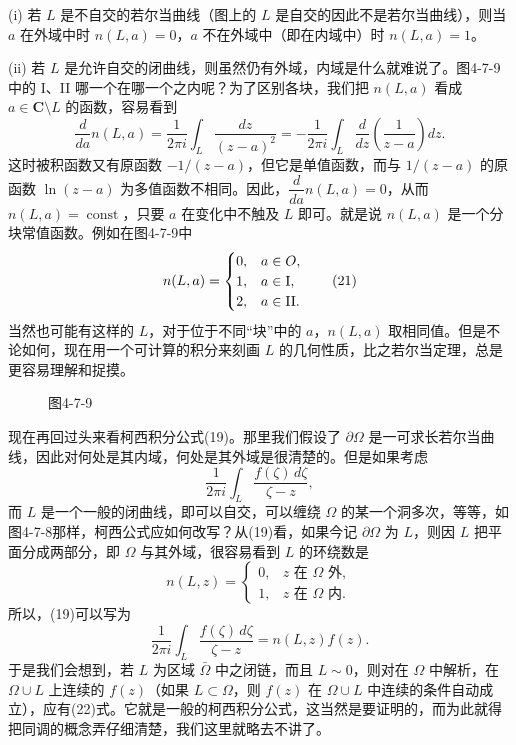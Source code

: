 (i) 若 $L$ 是不自交的若尔当曲线（图上的 $L$ 是自交的因此不是若尔当曲线），则当 $a$ 在外域中时 $n(L,a)=0$，$a$ 不在外域中（即在内域中）时 $n(L,a)=1$。

(ii) 若 $L$ 是允许自交的闭曲线，则虽然仍有外域，内域是什么就难说了。图4-7-9中的 I、II 哪一个在哪一个之内呢？为了区别各块，我们把 $n(L,a)$ 看成 $a\in\mathbf C\setminus L$ 的函数，容易看到
\[
 \frac d{da}n(L,a)=\frac1{2\pi i}\int_L\frac{dz}{(z-a)^2}
 =-\frac1{2\pi i}\int_L\frac d{dz}\left(\frac1{z-a}\right)dz.
\]
这时被积函数又有原函数 $-1/(z-a)$，但它是单值函数，而与 $1/(z-a)$ 的原函数 $\ln(z-a)$ 为多值函数不相同。因此，$\dfrac d{da}n(L,a)=0$，从而 $n(L,a)=\operatorname{const}$，只要 $a$ 在变化中不触及 $L$ 即可。就是说 $n(L,a)$ 是一个分块常值函数。例如在图4-7-9中
\begin{equation}
 n(L,a)=
 \begin{cases}
 0,&a\in O,\\
 1,&a\in {\rm I},\\
 2,&a\in {\rm II}.
 \end{cases}
 \tag{21}
\end{equation}
当然也可能有这样的 $L$，对于位于不同“块”中的 $a$，$n(L,a)$ 取相同值。但是不论如何，现在用一个可计算的积分来刻画 $L$ 的几何性质，比之若尔当定理，总是更容易理解和捉摸。

\begin{figure}[htbp]
\centering
{}
\caption*{图4-7-9}
\end{figure}

现在再回过头来看柯西积分公式(19)。那里我们假设了 $\partial\Omega$ 是一可求长若尔当曲线，因此对何处是其内域，何处是其外域是很清楚的。但是如果考虑
\[
 \frac1{2\pi i}\int_L\frac{f(\zeta)\,d\zeta}{\zeta-z},
\]
而 $L$ 是一个一般的闭曲线，即可以自交，可以缠绕 $\Omega$ 的某一个洞多次，等等，如图4-7-8那样，柯西公式应如何改写？从(19)看，如果今记 $\partial\Omega$ 为 $L$，则因 $L$ 把平面分成两部分，即 $\Omega$ 与其外域，很容易看到 $L$ 的环绕数是
\[
 n(L,z)=
 \begin{cases}
 0,&z\text{ 在 }\Omega\text{ 外},\\
 1,&z\text{ 在 }\Omega\text{ 内}.
 \end{cases}
\]
所以，(19)可以写为
\begin{equation}
 \frac1{2\pi i}\int_L\frac{f(\zeta)\,d\zeta}{\zeta-z}=n(L,z)f(z).
 \tag{22}
\end{equation}
于是我们会想到，若 $L$ 为区域 $\bar\Omega$ 中之闭链，而且 $L\sim0$，则对在 $\Omega$ 中解析，在 $\Omega\cup L$ 上连续的 $f(z)$（如果 $L\subset\Omega$，则 $f(z)$ 在 $\Omega\cup L$ 中连续的条件自动成立），应有(22)式。它就是一般的柯西积分公式，这当然是要证明的，而为此就得把同调的概念弄仔细清楚，我们这里就略去不讲了。

